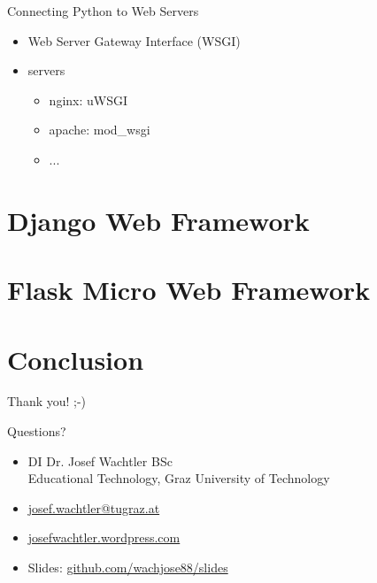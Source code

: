 \documentclass{beamer}
\begin{document}
\begin{frame}{Connecting Python to Web Servers}
 
  \begin{itemize}
    \item Web Server Gateway Interface (WSGI)
    \item servers
    \begin{itemize}
      \item nginx: uWSGI
      \item apache: mod\_wsgi
      \item ...
    \end{itemize}
  \end{itemize}
  
\end{frame}



\section{Django Web Framework}



\section{Flask Micro Web Framework}



\section{Conclusion}

\begin{frame}{Thank you! ;-)}
  
  \begin{center}
    \begin{huge}
      Questions?
    \end{huge}
  \end{center}
 
  \begin{itemize}
    \item DI Dr. Josef Wachtler BSc \\
    Educational Technology, Graz University of Technology
    \item \href{mailto:josef.wachtler@tugraz.at}{josef.wachtler@tugraz.at} 
    \item \href{https://josefwachtler.wordpress.com/}{josefwachtler.wordpress.com} 
    \item Slides: \href{https://github.com/wachjose88/slides}{github.com/wachjose88/slides}
  \end{itemize}
  

\end{frame}
\end{document}
